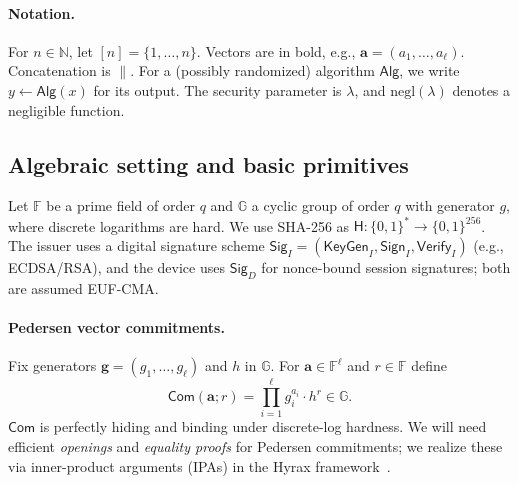 \paragraph{Notation.}
For $n\in\mathbb{N}$, let $[n]=\{1,\dots,n\}$.
Vectors are in bold, e.g., $\mathbf{a}=(a_1,\ldots,a_\ell)$.
Concatenation is $\|$.
For a (possibly randomized) algorithm $\mathsf{Alg}$, we write $y \leftarrow \mathsf{Alg}(x)$ for its output.
The security parameter is $\lambda$, and $\mathrm{negl}(\lambda)$ denotes a negligible function.
\subsection{Algebraic setting and basic primitives}
\label{subsec:algebra}
Let $\mathbb{F}$ be a prime field of order $q$ and $\mathbb{G}$ a cyclic group of order $q$ with generator $g$, where discrete logarithms are hard.
We use SHA\mbox{-}256 as $\mathsf{H}:\{0,1\}^\ast\!\rightarrow\!\{0,1\}^{256}$.
The issuer uses a digital signature scheme $\mathsf{Sig}_I=(\mathsf{KeyGen}_I,\mathsf{Sign}_I,\mathsf{Verify}_I)$ (e.g., ECDSA/RSA), and the device uses $\mathsf{Sig}_D$ for nonce-bound session signatures; both are assumed EUF\mbox{-}CMA.

\paragraph{Pedersen vector commitments.}
Fix generators $\mathbf{g}=(g_1,\ldots,g_\ell)$ and $h$ in $\mathbb{G}$.
For $\mathbf{a}\in\mathbb{F}^\ell$ and $r\in\mathbb{F}$ define
\[
\mathsf{Com}(\mathbf{a};r)=\prod_{i=1}^{\ell} g_i^{a_i}\cdot h^{r}\in\mathbb{G}.
\]
$\mathsf{Com}$ is perfectly hiding and binding under discrete\mbox{-}log hardness.
We will need efficient \emph{openings} and \emph{equality proofs} for Pedersen commitments; we realize these via inner-product arguments (IPAs) in the Hyrax framework~\cite{SP:WTSTW18}.

